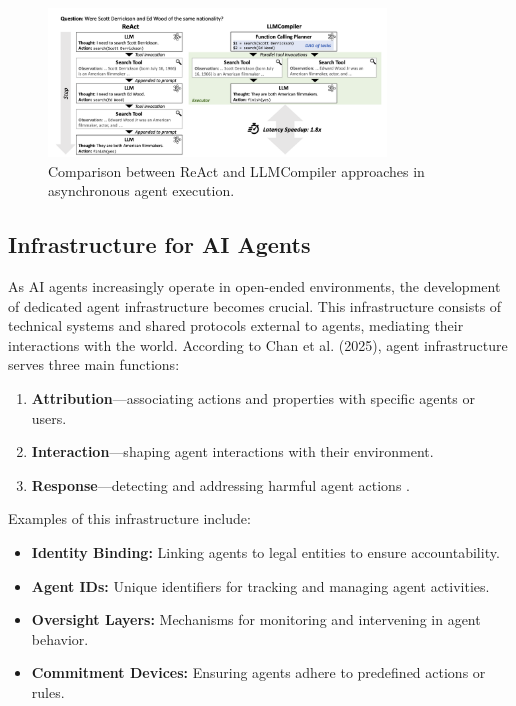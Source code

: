 \begin{figure}[h!]
\centering
\includegraphics[width=0.8\textwidth]{Assets/agent-architecture.png}
\caption{Comparison between ReAct and LLMCompiler approaches in asynchronous agent execution.}
\end{figure}

\newpage
\subsection{Infrastructure for AI Agents}

As AI agents increasingly operate in open-ended environments, the development of dedicated agent infrastructure becomes crucial. This infrastructure consists of technical systems and shared protocols external to agents, mediating their interactions with the world. According to Chan et al. (2025), agent infrastructure serves three main functions: 
\begin{enumerate}
    \item \textbf{Attribution}—associating actions and properties with specific agents or users.
    \item \textbf{Interaction}—shaping agent interactions with their environment.
    \item \textbf{Response}—detecting and addressing harmful agent actions \cite{11}.
\end{enumerate}

Examples of this infrastructure include:
\begin{itemize}
    \item \textbf{Identity Binding:} Linking agents to legal entities to ensure accountability.
    \item \textbf{Agent IDs:} Unique identifiers for tracking and managing agent activities.
    \item \textbf{Oversight Layers:} Mechanisms for monitoring and intervening in agent behavior.
    \item \textbf{Commitment Devices:} Ensuring agents adhere to predefined actions or rules.
\end{itemize}

